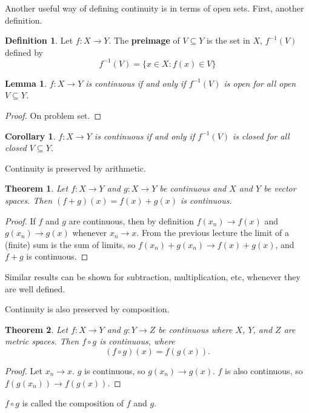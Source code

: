 \documentclass[12pt,reqno]{amsart}
\newtheorem{theorem}{Theorem}[section]
\newtheorem{corollary}{Corollary}[section]
\newtheorem{lemma}{Lemma}[section]
\theoremstyle{definition}
\newtheorem{definition}{Definition}[section]
\renewcommand{\to}{{\rightarrow}}
\begin{document}
Another useful way of defining continuity is in terms of open
sets. First, another definition.
\begin{definition}
  Let $f: X \to Y$. The \textbf{preimage} of $V \subseteq Y$ is the
  set in $X$, $f^{-1}(V)$ defined by
  \[ f^{-1} (V) = \{ x \in X: f(x) \in V \} \]
\end{definition}

\begin{lemma}\label{lem:copen}
  $f:X \to Y$ is continuous if and only if $f^{-1}(V)$ is open for all
  open $V \subseteq Y$. 
\end{lemma}
\begin{proof}
  On problem set.
\end{proof}
\begin{corollary}
  $f:X \to Y$ is continuous if and only if $f^{-1}(V)$ is closed for all
  closed $V \subseteq Y$. 
\end{corollary}

Continuity is preserved by arithmetic. 
\begin{theorem}
  Let $f:X \to Y$ and $g:X \to Y$ be continuous and $X$ and $Y$ be
  vector spaces. Then $(f+g)(x) = f(x) + g(x)$ is continuous.
\end{theorem}
\begin{proof}
  If $f$ and $g$ are continuous, then by definition $f(x_n) \to f(x)$
  and $g(x_n) \to g(x)$ whenever $x_n \to x$. From the previous
  lecture the limit of a (finite) sum is the sum of limits, so 
  $f(x_n) + g(x_n) \to f(x) + g(x)$, and $f+g$ is continuous.
\end{proof}
Similar results can be shown for subtraction, multiplication, etc,
whenever they are well defined.

Continuity is also preserved by composition.
\begin{theorem}
  Let $f:X \to Y$ and $g:Y \to Z$ be continuous where $X$, $Y$, and
  $Z$ are metric spaces. Then $f \circ g$ is continuous, where
  \[ (f \circ g)(x) = f(g(x)). \]
\end{theorem}  
\begin{proof}
  Let $x_n \to x$. $g$ is continuous, so $g(x_n) \to g(x)$. $f$ is
  also continuous, so $f(g(x_n)) \to f(g(x))$.
\end{proof}
$f\circ g$ is called the composition of $f$ and $g$.
\end{document}
